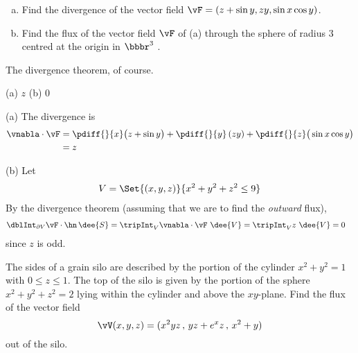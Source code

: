 \begin{question}[M317 2012D] %

\begin{enumerate}[(a)]
\item
Find the divergence of the vector field $\vF = (z + \sin y, zy, \sin x \cos y)$.
\item
Find the flux of the vector field $\vF$ of (a) through the sphere of 
radius $3$ centred at the origin in $\bbbr^3$ .
\end{enumerate}
\end{question}

\begin{hint} 
The divergence theorem, of course.
\end{hint}

\begin{answer} 
(a) $z$\qquad
(b) $0$
\end{answer}

\begin{solution} (a)
The divergence is
\begin{align*}
\vnabla\cdot\vF &= 
    \pdiff{}{x}\big(z+\sin y\big)
     +\pdiff{}{y}\left(zy\right)
     +\pdiff{}{z}\big(\sin x\cos y\big) \\
   &=   z
\end{align*}

\noindent (b) Let
\begin{align*}
V=\Set{(x,y,z)}{x^2+y^2+z^2\le 9}
\end{align*}
By the divergence theorem (assuming that we are to find the \emph{outward} 
flux),
\begin{align*}
\dblInt_{\partial V}  \vF\cdot\hn\,\dee{S}
&= \tripInt_V \vnabla\cdot \vF\ \dee{V} 
= \tripInt_V z\ \dee{V} 
= 0
\end{align*}
since $z$ is odd.
\end{solution}

\begin{question}
The sides of a grain silo are described by the portion of the 
cylinder $x^2 + y^2 = 1$ with $0 \le z\le 1$. The top of the silo is 
given by the portion of the sphere $x^2+ y^2+ z^2 = 2$ lying within the 
cylinder and above the $xy$-plane. Find the flux of the vector field
\begin{equation*}
\vV(x,y,z) = (x^2yz\,,\, yz+e^xz\,,\, x^2+y ) 
\end{equation*}
out of the silo. 
\end{question}


